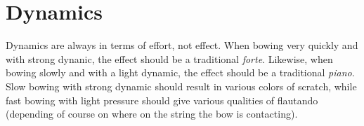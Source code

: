 \section{Dynamics}

Dynamics are always in terms of effort, not effect. When bowing very
quickly and with strong dynanic, the effect should be a traditional
\emph{forte}. Likewise, when bowing slowly and with a light dynamic, the
effect should be a traditional \emph{piano}. Slow bowing with strong
dynamic should result in various colors of scratch, while fast bowing with
light pressure should give various qualities of flautando (depending of
course on where on the string the bow is contacting).
